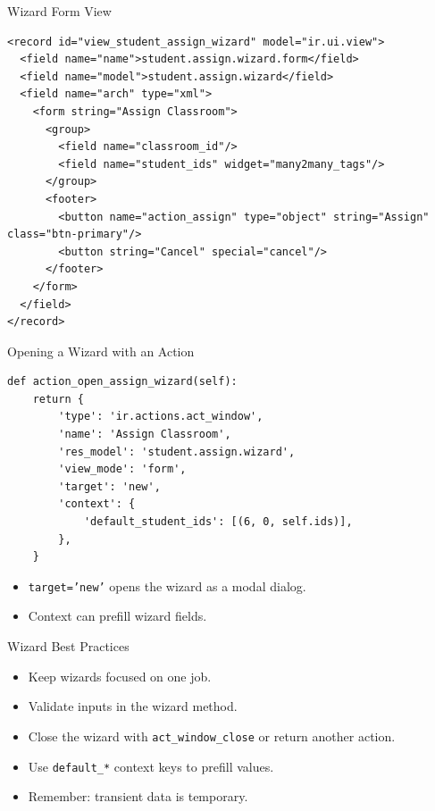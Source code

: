 \begin{frame}[fragile]{Wizard Form View}
\begin{lstlisting}[style=xml]
<record id="view_student_assign_wizard" model="ir.ui.view">
  <field name="name">student.assign.wizard.form</field>
  <field name="model">student.assign.wizard</field>
  <field name="arch" type="xml">
	<form string="Assign Classroom">
	  <group>
		<field name="classroom_id"/>
		<field name="student_ids" widget="many2many_tags"/>
	  </group>
	  <footer>
		<button name="action_assign" type="object" string="Assign" class="btn-primary"/>
		<button string="Cancel" special="cancel"/>
	  </footer>
	</form>
  </field>
</record>
\end{lstlisting}
\end{frame}

\begin{frame}[fragile]{Opening a Wizard with an Action}
\begin{lstlisting}
def action_open_assign_wizard(self):
	return {
		'type': 'ir.actions.act_window',
		'name': 'Assign Classroom',
		'res_model': 'student.assign.wizard',
		'view_mode': 'form',
		'target': 'new',
		'context': {
			'default_student_ids': [(6, 0, self.ids)],
		},
	}
\end{lstlisting}
	\begin{itemize}
		\item \texttt{target='new'} opens the wizard as a modal dialog.
		\item Context can prefill wizard fields.
	\end{itemize}
\end{frame}

\begin{frame}[fragile]{Wizard Best Practices}
	\begin{itemize}
		\item Keep wizards focused on one job.
		\item Validate inputs in the wizard method.
		\item Close the wizard with \texttt{act\_window\_close} or return another action.
		\item Use \texttt{default\_*} context keys to prefill values.
		\item Remember: transient data is temporary.
	\end{itemize}
\end{frame}
